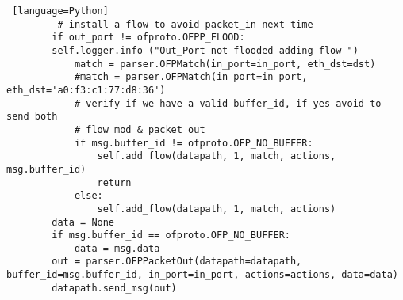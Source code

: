 \begin{lstlisting} [language=Python]
		 # install a flow to avoid packet_in next time
		if out_port != ofproto.OFPP_FLOOD:
		self.logger.info ("Out_Port not flooded adding flow ")	
			match = parser.OFPMatch(in_port=in_port, eth_dst=dst)
			#match = parser.OFPMatch(in_port=in_port, eth_dst='a0:f3:c1:77:d8:36')
			# verify if we have a valid buffer_id, if yes avoid to send both
			# flow_mod & packet_out
			if msg.buffer_id != ofproto.OFP_NO_BUFFER:
				self.add_flow(datapath, 1, match, actions, msg.buffer_id)
				return
			else:
				self.add_flow(datapath, 1, match, actions)
		data = None
		if msg.buffer_id == ofproto.OFP_NO_BUFFER:
			data = msg.data	
		out = parser.OFPPacketOut(datapath=datapath, buffer_id=msg.buffer_id, in_port=in_port, actions=actions, data=data)
		datapath.send_msg(out)
\end{lstlisting}
